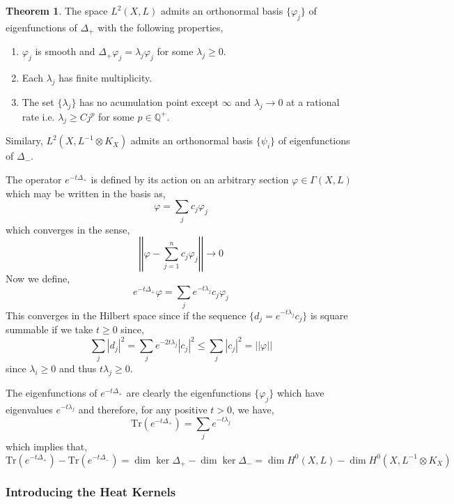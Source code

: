\documentclass[12pt]{extarticle}
\newcommand{\Tr}[1]{\mathrm{Tr}\left( #1 \right)}
\theoremstyle{definition}
\newtheorem{theorem}{Theorem}[section]
\newenvironment{definition}[1][Definition:]{\begin{trivlist}
\item[\hskip \labelsep {\bfseries #1}]}{\end{trivlist}}
\begin{document}
\begin{theorem}
The space $L^2(X, L)$ admits an orthonormal basis $\{ \varphi_j \}$ of eigenfunctions of $\Delta_{+}$ with the following properties,
\begin{enumerate}
\item $\varphi_j$ is smooth and $\Delta_{+} \varphi_j = \lambda_j \varphi_j$ for some $\lambda_j \ge 0$.
\item Each $\lambda_j$ has finite multiplicity.
\item The set $\{ \lambda_j \}$ has no acumulation point except $\infty$ and $\lambda_j \to 0$ at a rational rate i.e. $\lambda_j \ge C j^p$ for some $p \in \mathbb{Q}^{+}$.  
\end{enumerate}
\end{theorem}
\noindent
Similary, $L^2(X, L^{-1} \otimes K_X)$ admits an orthonormal basis $\{ \psi_i \}$ of eigenfunctions of $\Delta_{-}$. 
\begin{definition}
The operator $e^{- t \Delta_{+}}$ is defined by its action on an arbitrary section $\varphi \in \Gamma(X, L)$ which may be written in the basis as,
\[ \varphi = \sum_{j} c_j \varphi_j \]
which converges in the sense,
\[ \left| \left| \varphi - \sum_{j = 1}^n c_j \varphi_j \right| \right| \to 0 \]
Now we define,
\[ e^{-t \Delta_{+}} \varphi = \sum_j e^{- t \lambda_j} c_j \varphi_j \] 
This converges in the Hilbert space since if the sequence $\{ d_j = e^{- t \lambda_j} c_j \}$ is square summable if we take $t \ge 0$ since,
\[ \sum_{j} |d_j|^2 = \sum_{j} e^{-2 t \lambda_j}  |c_j|^2 \le \sum_j |c_j|^2 = || \varphi || \]
since $\lambda_i \ge 0$ and thus $t \lambda_j \ge 0$. 
\end{definition}
The eigenfunctions of $e^{- t \Delta_{+}}$ are clearly the eigenfunctions $\{ \varphi_j \}$ which have eigenvalues $e^{- t \lambda_j}$ and therefore, for any positive $t > 0$, we have,
\[ \Tr{e^{- t \Delta_{+}}} = \sum_{j} e^{- t \lambda_j} \]
which implies that,
\[ \Tr{e^{- t \Delta_{+}}} - \Tr{e^{- t \Delta_{-}}} = \dim{\ker{\Delta_+}} - \dim{\ker{\Delta_{-}}} = \dim{H^0(X, L)} - \dim{H^0(X, L^{-1} \otimes K_X)} \] 

\subsubsection{Introducing the Heat Kernels}
\end{document}
